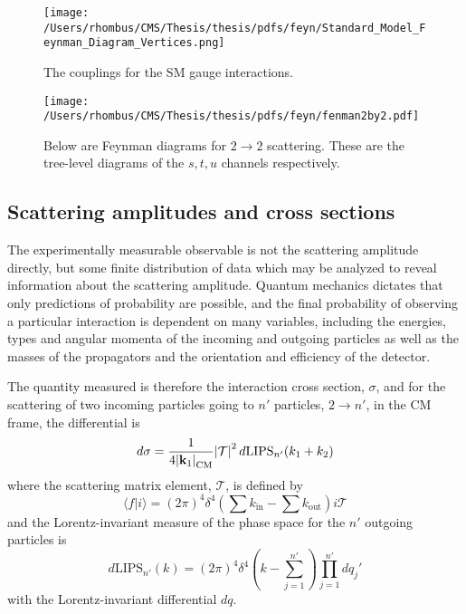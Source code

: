 \begin{figure}[!h]
 \center
 \caption[Illustrations of SM couplings]{
  The couplings for the SM gauge interactions.
 } 
 \texttt{[image: /Users/rhombus/CMS/Thesis/thesis/pdfs/feyn/Standard\_Model\_Feynman\_Diagram\_Vertices.png]}
    \label{fig:smcouplings}
\end{figure}
\begin{figure}[!htb]
 \center
 \caption[Feynman diagrams for $2\rightarrow2$ scattering]{
  Below are Feynman diagrams for $2\rightarrow2$ scattering. 
  These are the tree-level diagrams of the $s,t,u$
   channels respectively.
 } 
 \texttt{[image: /Users/rhombus/CMS/Thesis/thesis/pdfs/feyn/fenman2by2.pdf]}
    \label{fig:fenyman2by2}
\end{figure}

\subsection{Scattering amplitudes and cross sections}

 The experimentally measurable observable
  is not the scattering amplitude directly,
  but some finite distribution of data
  which may be analyzed to reveal
  information about the scattering amplitude.
 Quantum mechanics dictates that 
  only predictions of probability are possible,
  and the final probability of observing
  a particular interaction
  is dependent on many variables, including
  the energies, types and angular momenta of the incoming
  and outgoing particles as well as
  the masses of the propagators
  and the orientation and efficiency of the detector.

 The quantity measured is therefore the 
  interaction cross section, $\sigma$,
  and for the scattering of two incoming 
  particles going to $n'$ particles, $2\rightarrow n'$,
  in the CM frame, the differential is
\begin{equation}
 d\sigma = \frac{1}{4\abs{\mathbf{k}_1}_{\mathrm{CM}}}\abs{\mathcal{T}}^2 
  d\mathrm{LIPS}_{n'}(k_1 + k_2)
\end{equation}
  where the scattering matrix element, $\mathcal{T}$, is defined by 
\begin{equation}\label{eq:matrixelement}
\langle f | i \rangle = (2\pi)^4\delta^4\left(\sum k_{\mathrm{in}}-\sum k_{\mathrm{out}}\right)
  i \mathcal{T}
\end{equation}
  and the Lorentz-invariant measure of the 
  phase space for the $n'$ outgoing particles is
\begin{equation}\label{eq:dlips}
 d\mathrm{LIPS}_{n'}(k) = (2\pi)^4 \delta^4\left(k - \sum_{j=1}^{n'} \right )
  \prod_{j=1}^{n'}dq_j'
\end{equation}
 with the Lorentz-invariant differential $dq$.

